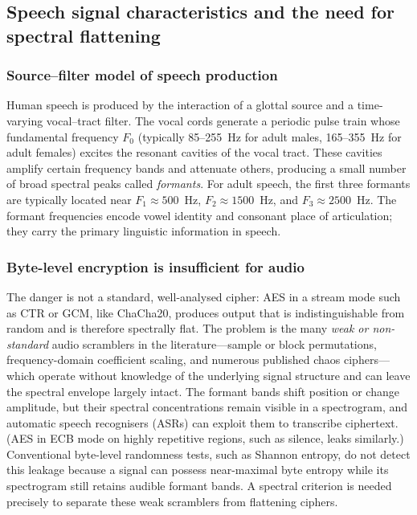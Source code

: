 \documentclass[pdflatex,sn-mathphys-num]{sn-jnl}%
\theoremstyle{thmstyleone}%
\theoremstyle{thmstyletwo}%
\theoremstyle{thmstylethree}%
\begin{document}
\subsection{Speech signal characteristics and the need for spectral flattening}
\label{sec:speech_characteristics}

\subsubsection{Source--filter model of speech production}
Human speech is produced by the interaction of a glottal source and a 
time-varying vocal--tract filter. The vocal cords generate a periodic pulse 
train whose fundamental frequency $F_0$ (typically 85--255~Hz for adult males, 
165--355~Hz for adult females) excites the resonant cavities of the vocal tract. 
These cavities amplify certain frequency bands and attenuate others, producing 
a small number of broad spectral peaks called \emph{formants}. For adult speech, 
the first three formants are typically located near $F_1 \approx 500$~Hz, 
$F_2 \approx 1500$~Hz, and $F_3 \approx 2500$~Hz. The formant frequencies 
encode vowel identity and consonant place of articulation; they carry the 
primary linguistic information in speech.

\subsubsection{Byte-level encryption is insufficient for audio}
The danger is not a standard, well-analysed cipher: AES in a stream mode such as CTR or GCM, like ChaCha20, produces output that is indistinguishable from random and is therefore spectrally flat. The problem is the many \emph{weak or non-standard} audio scramblers in the literature---sample or block permutations, frequency-domain coefficient scaling, and numerous published chaos ciphers---which operate without knowledge of the underlying signal structure and can leave the spectral envelope largely intact. The formant bands shift position or change amplitude, but their spectral concentrations remain visible in a spectrogram, and automatic speech recognisers (ASRs) can exploit them to transcribe ciphertext. (AES in ECB mode on highly repetitive regions, such as silence, leaks similarly.) Conventional byte-level randomness tests, such as Shannon entropy, do not detect this leakage because a signal can possess near-maximal byte entropy while its spectrogram still retains audible formant bands. A spectral criterion is needed precisely to separate these weak scramblers from flattening ciphers.
\end{document}
